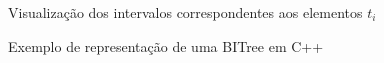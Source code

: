 \begin{frame}[fragile]{Visualização dos intervalos correspondentes aos elementos $t_i$}
\begin{figure}
\begin{tikzpicture}[scale=0.95]
        \end{tikzpicture}

    \end{figure}

\end{frame}

\begin{frame}[fragile]{Exemplo de representação de uma BITree em C++}
\end{frame}
